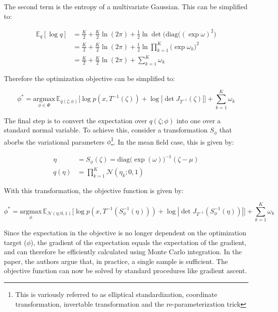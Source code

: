 \documentclass[10pt]{article}
\begin{document}
The second term is the entropy of a multivariate Gaussian. This can be simplified to:

\begin{align*}
  \mathbb{E}_q[\log q] &= \frac{K}{2} + \frac{K}{2}\ln(2\pi) + \frac{1}{2}\ln\det\big(\text{diag}((\exp \omega)^2\big) \\
  &= \frac{K}{2} + \frac{K}{2}\ln(2\pi) + \frac{1}{2}\ln\prod_{k=1}^K\big(\exp \omega_{k}\big)^2 \\
  &= \frac{K}{2} + \frac{K}{2}\ln(2\pi) + \sum_{k=1}^{K}\omega_k
\end{align*}

Therefore the optimization objective can be simplified to:

\begin{equation*}
  \phi^* = \underset{\phi \in \Phi}{\text{argmax}} \, \mathbb{E}_{q(\zeta; \phi)}\big[\log p(x, T^{-1}(\zeta)) + \log |\det J_{T^{-1}}(\zeta)|\big] + \sum_{k=1}^{K}\omega_k
\end{equation*}


The final step is to convert the expectation over $q(\zeta; \phi)$ into one over a standard normal variable. To achieve
this, consider a transformation $S_{\phi}$ that aborbs the variational parameters $\phi$\footnote{This is variously 
referred to as elliptical standardization, coordinate transformation, invertable transformation and the re-parameterization
trick}. In the mean field case, this is given by:

\begin{align*}
  \eta &= S_{\phi}(\zeta) = \text{diag}\big(\exp(\omega)\big)^{-1}(\zeta - \mu) \\
  q(\eta) &= \prod_{k=1}^{K}\mathcal{N}(\eta_k; 0, 1)
\end{align*}


With this transformation, the objective function is given by:

\begin{equation*}
  \phi^* = \underset{\phi}{\text{argmax}} \, \mathbb{E}_{\mathcal{N}(\eta; 0, 1)}\big[\log p(x, T^{-1}(S_\phi^{-1}(\eta))) + \log |\det J_{T^{-1}}(S_\phi^{-1}(\eta))|\big] + \sum_{k=1}^{K}\omega_k
\end{equation*}

Since the expectation in the objective is no longer dependent on the optimization target ($\phi$), the gradient of the expectation
equals the expectation of the gradient, and can therefore be efficiently calculated using Monte Carlo integration. In the paper, 
the authors argue that, in practice, a single sample is sufficient. The objective function can now be solved by standard procedures
like gradient ascent. 
\end{document}
